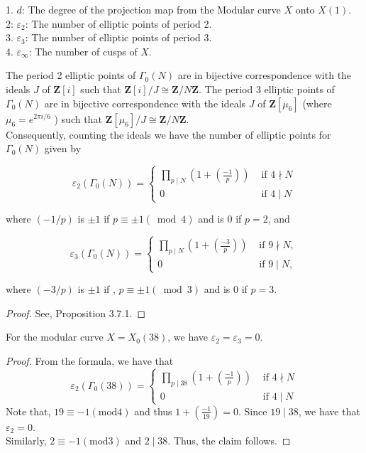 1. $d$: The degree of the projection map from the Modular curve $X$ onto $X(1)$.\\
2: $\varepsilon_2$: The number of elliptic points of period 2.\\
3. $\varepsilon_3$: The number of elliptic points of period 3.\\
4. $\varepsilon_\infty$: The number of cusps of $X$.

\begin{theorem}
     The period 2 elliptic points of $\Gamma_{0}(N)$ are in bijective correspondence with the ideals $J$ of $\mathbf{Z}[i]$ such that $\mathbf{Z}[i] / J \cong \mathbf{Z} / N \mathbf{Z}$. The period 3 elliptic points of $\Gamma_{0}(N)$ are in bijective correspondence with the ideals $J$ of $\mathbf{Z}\left[\mu_{6}\right]$ (where $\mu_{6}=e^{2 \pi i / 6}$ ) such that $\mathbf{Z}\left[\mu_{6}\right] / J \cong \mathbf{Z} / N \mathbf{Z}$.\\

     Consequently, counting the ideals we have the number of elliptic points for $\Gamma_{0}(N)$ given by 

$$
\varepsilon_{2}\left(\Gamma_{0}(N)\right)= \begin{cases}\prod_{p \mid N}\left(1+\left(\frac{-1}{p}\right)\right) & \text { if } 4 \nmid N \\ 0 & \text { if } 4 \mid N\end{cases}
$$

where $(-1 / p)$ is $\pm 1$ if $p \equiv \pm 1(\bmod 4)$ and is 0 if $p=2$, and

$$
\varepsilon_{3}\left(\Gamma_{0}(N)\right)= \begin{cases}\prod_{p \mid N}\left(1+\left(\frac{-3}{p}\right)\right) & \text { if } 9 \nmid N, \\ 0 & \text { if } 9 \mid N,\end{cases}
$$

where $(-3 / p)$ is $\pm 1$ if ,  $p \equiv \pm 1(\bmod 3)$ and is 0 if $p=3$.


\end{theorem}

\begin{proof}
    See, \cite{diamond2005first} Proposition 3.7.1.
\end{proof}
\begin{corollary}

For the modular curve $X=X_0(38)$, we have $\varepsilon_2=\varepsilon_3=0.$
    \begin{proof}
    From the formula, we have that $$
\varepsilon_{2}\left(\Gamma_{0}(38)\right)= \begin{cases}\prod_{p \mid 38}\left(1+\left(\frac{-1}{p}\right)\right) & \text { if } 4 \nmid N \\ 0 & \text { if } 4 \mid N\end{cases}
$$ Note that, $19 \equiv -1 (\text{mod} 4)$ and thus $1+(\frac{-1}{19})=0$. Since $19 \mid 38$, we have that $\varepsilon_2=0$. \\

Similarly, $2 \equiv -1 (\text{mod} 3)$ and $2 \mid 38$. Thus, the claim follows. 
    \end{proof}
\end{corollary}

